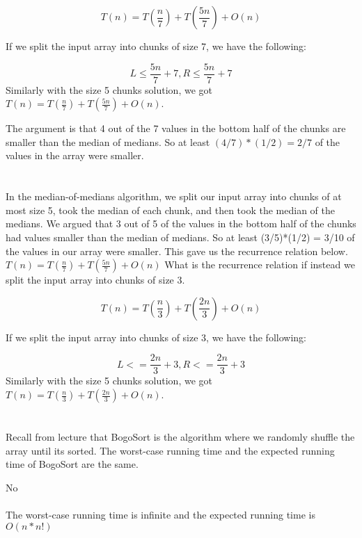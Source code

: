 \documentclass [12pt]{article}
\begin{document}
\begin{Solution}
$$T(n) = T\left(\frac{n}{7}\right) + T\left(\frac{5n}{7}\right) + O(n)$$

If we split the input array into chunks of size 7, we have the following:

$$
L \leq \frac{5n}{7} + 7, R \leq \frac{5n}{7} + 7
$$
Similarly with the size 5 chunks solution, we got $T(n) = T\left(\frac{n}{7}\right) + T\left(\frac{5n}{7}\right) + O(n)$.

The argument is that 4 out of the 7 values in the bottom half of the chunks are smaller than the median of medians. So at least $(4/7) * (1/2) = 2/7$ of the values in the array were smaller.
\end{Solution}


\section{} In the median-of-medians algorithm, we split our input array into chunks of at most size 5, took the median of each chunk, and then took the median of the medians. We argued that 3 out of 5 of the values in the bottom half of the chunks had values smaller than the median of medians. So at least (3/5)*(1/2) = 3/10 of the values in our array were smaller. This gave us the recurrence relation below. $T(n) = T\left(\frac{n}{7}\right) + T\left(\frac{5n}{7}\right) + O(n)$
What is the recurrence relation if instead we split the input array into chunks of size 3. 

\begin{Solution}
$$T(n) = T\left(\frac{n}{3}\right) + T\left(\frac{2n}{3}\right) + O(n)$$

If we split the input array into chunks of size 3, we have the following:

$$
L <= \frac{2n}{3} + 3, R <= \frac{2n}{3} + 3
$$
Similarly with the size 5 chunks solution, we got $T(n) = T\left(\frac{n}{3}\right) + T\left(\frac{2n}{3}\right) + O(n)$.
\end{Solution}


\section{} Recall from lecture that BogoSort is the algorithm where we randomly shuffle the array until its sorted. The worst-case running time and the expected running time of BogoSort are the same.

\begin{Solution}
No
\paragraph{} 
The worst-case running time is infinite and the expected running time is $O(n*n!)$
\end{Solution}
\end{document}
